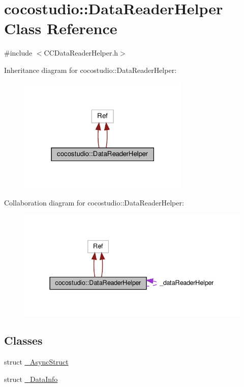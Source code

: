 \hypertarget{classcocostudio_1_1DataReaderHelper}{}\section{cocostudio\+:\+:Data\+Reader\+Helper Class Reference}
\label{classcocostudio_1_1DataReaderHelper}


{\ttfamily \#include $<$C\+C\+Data\+Reader\+Helper.\+h$>$}



Inheritance diagram for cocostudio\+:\+:Data\+Reader\+Helper\+:
\nopagebreak
\begin{figure}[H]
\begin{center}
\leavevmode
\includegraphics[width=231pt]{classcocostudio_1_1DataReaderHelper__inherit__graph}
\end{center}
\end{figure}


Collaboration diagram for cocostudio\+:\+:Data\+Reader\+Helper\+:
\nopagebreak
\begin{figure}[H]
\begin{center}
\leavevmode
\includegraphics[width=337pt]{classcocostudio_1_1DataReaderHelper__coll__graph}
\end{center}
\end{figure}
\subsection*{Classes}
\begin{DoxyCompactItemize}
\item 
struct \hyperlink{structcocostudio_1_1DataReaderHelper_1_1__AsyncStruct}{\+\_\+\+Async\+Struct}
\item 
struct \hyperlink{structcocostudio_1_1DataReaderHelper_1_1__DataInfo}{\+\_\+\+Data\+Info}
\end{DoxyCompactItemize}
